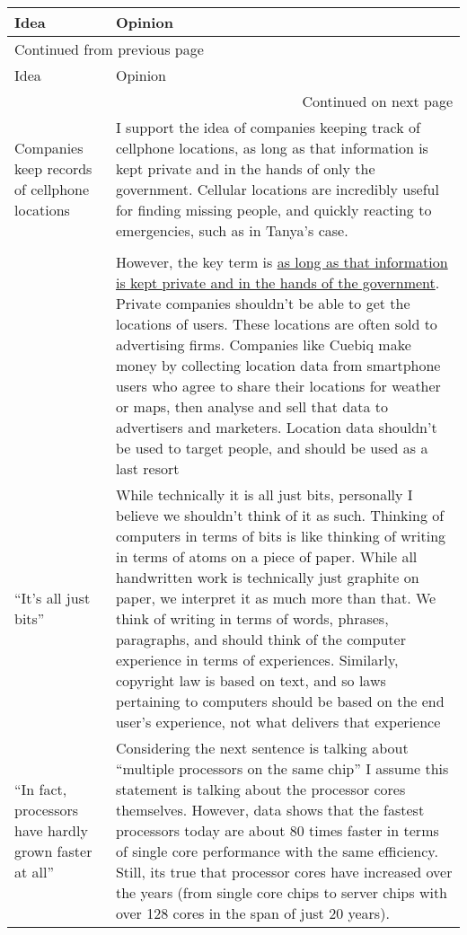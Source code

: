 \documentclass[11pt]{article}
\begin{document}
\begin{longtable}{|p{2cm}|p{8cm}|}
\hline
Idea & Opinion\\
\hline
\endfirsthead
\multicolumn{2}{l}{Continued from previous page} \\
\hline

Idea & Opinion \\

\hline
\endhead
\hline\multicolumn{2}{r}{Continued on next page} \\
\endfoot
\endlastfoot
\hline
Companies keep records of cellphone locations & I support the idea of companies keeping track of cellphone locations, as long as that information is kept private and in the hands of only the government. Cellular locations are incredibly useful for finding missing people, and quickly reacting to emergencies, such as in Tanya's case.\\
 & \\
 & However, the key term is \uline{as long as that information is kept private and in the hands of the government}. Private companies shouldn't be able to get the locations of users. These locations are often sold to advertising firms. Companies like Cuebiq make money by collecting location data from smartphone users who agree to share their locations for weather or maps, then analyse and sell that data to advertisers and marketers. Location data shouldn't be used to target people, and should be used as a last resort\\
\hline
``It's all just bits'' & While technically it is all just bits, personally I believe we shouldn't think of it as such. Thinking of computers in terms of bits is like thinking of writing in terms of atoms on a piece of paper. While all handwritten work is technically just graphite on paper, we interpret it as much more than that. We think of writing in terms of words, phrases, paragraphs, and should think of the computer experience in terms of experiences. Similarly, copyright law is based on text, and so laws pertaining to computers should be based on the end user's experience, not what delivers that experience\\
\hline
``In fact, processors have hardly grown faster at all'' & Considering the next sentence is talking about ``multiple processors on the same chip'' I assume this statement is talking about the processor cores themselves. However, data shows that the fastest processors today are about 80 times faster in terms of single core performance with the same efficiency. Still, its true that processor cores have increased over the years (from single core chips to server chips with over 128 cores in the span of just 20 years).\\

\end{longtable}
\end{document}
